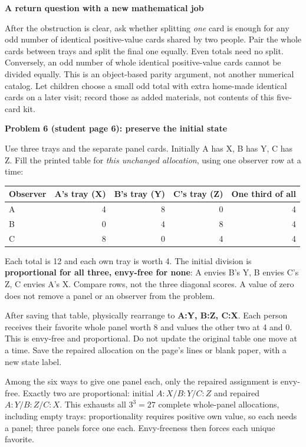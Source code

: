 \documentclass[11pt]{article}
\newcommand{\heading}[1]{\par\vspace{1.5mm}{\large\bfseries #1}\par\vspace{.8mm}}
\newcommand{\subhead}[1]{\par\vspace{1mm}\textbf{#1}\par}
\newcommand{\page}[1]{\newpage\heading{#1}}
\begin{document}
\subhead{A return question with a new mathematical job}
After the obstruction is clear, ask whether splitting \emph{one} card is enough for any odd number of identical positive-value cards shared by two people. Pair the whole cards between trays and split the final one equally. Even totals need no split. Conversely, an odd number of whole identical positive-value cards cannot be divided equally. This is an object-based parity argument, not another numerical catalog. Let children choose a small odd total with extra home-made identical cards on a later visit; record those as added materials, not contents of this five-card kit.

\page{Problems 6 and 7: three people and general claims}
\subhead{Problem 6 (student page 6): preserve the initial state}
Use three trays and the separate panel cards. Initially A has X, B has Y, C has Z. Fill the printed table for \emph{this unchanged allocation}, using one observer row at a time:

\begin{center}
\begin{tabular}{@{}lrrrr@{}}\toprule
Observer & A's tray (X) & B's tray (Y) & C's tray (Z) & One third of all\\\midrule
A & 4 & 8 & 0 & 4\\
B & 0 & 4 & 8 & 4\\
C & 8 & 0 & 4 & 4\\\bottomrule
\end{tabular}
\end{center}

Each total is 12 and each own tray is worth 4. The initial division is \textbf{proportional for all three, envy-free for none}: A envies B's Y, B envies C's Z, C envies A's X. Compare rows, not the three diagonal scores. A value of zero does not remove a panel or an observer from the problem.

After saving that table, physically rearrange to \textbf{A:Y, B:Z, C:X}. Each person receives their favorite whole panel worth 8 and values the other two at 4 and 0. This is envy-free and proportional. Do not update the original table one move at a time. Save the repaired allocation on the page's lines or blank paper, with a new state label.

Among the six ways to give one panel each, only the repaired assignment is envy-free. Exactly two are proportional: initial $A:X/B:Y/C:Z$ and repaired $A:Y/B:Z/C:X$. This exhausts all $3^3=27$ complete whole-panel allocations, including empty trays: proportionality requires positive own value, so each needs a panel; three panels force one each. Envy-freeness then forces each unique favorite.
\end{document}
